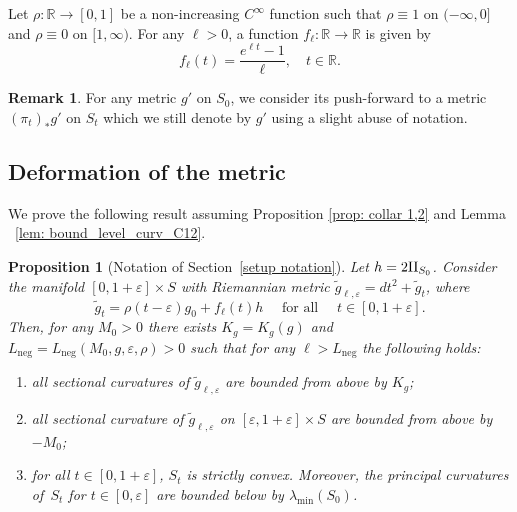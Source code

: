 \documentclass[JEP,XML,SOM,Unicode,NoFloatCountersInSection]{cedram}
\newenvironment{enumeratea}
{\bgroup\def\theenumi{\alph{enumi}}\begin{enumerate}}
{\end{enumerate}\egroup}
\newcommand{\Neg}{\mathrm{neg}}
\newtheorem{proposition}[theorem]{Proposition}
\theoremstyle{definition}
\newtheorem{remark}[theorem]{Remark}
\let\eps\varepsilon
\newcommand{\RomanNumeralCaps}[1]
{\MakeUppercase{\romannumeral #1}}
\newcommand{\II}{\textup{\RomanNumeralCaps{2}}}
\renewcommand{\>}{{\rangle}}
\newcommand{\<}{{\langle}}
\begin{document}
Let $\rho\colon\mathbb R\to [0,1]$ be a non-increasing $C^\infty$ function such that $\rho\equiv 1$ on $(-\infty,0]$ and $\rho\equiv 0$ on $[1,\infty)$. For any $\ell>0$, a function $f_{\ell}\colon\mathbb R\to\mathbb R$ is given by
\[
f_{\ell}(t)=\frac{e^{\ell t}-1}{\ell}
,\quad t\in\mathbb R.
\]

\begin{remark}
For any metric $g'$ on $S_0$, we consider its push-forward to a metric $(\pi_t)_*g'$ on $S_t$ which we still denote by $g'$ using a slight abuse of notation.
\end{remark}

\subsection{Deformation of the metric}
We prove the following result assuming Proposition \ref{prop: collar 1,2} and Lemma ~\ref{lem: bound_level_curv_C12}.
\begin{proposition}[Notation of Section~\ref{setup notation}]\label{collar 1,2}
 Let $h=2\II_{S_0}$. Consider the manifold $[0,1+\eps]\times S$ with Riemannian metric
$\tilde g_{\ell,\eps} = dt^2+\tilde g_t$, where
\begin{equation*}
\tilde g_t=\rho(t-\eps)g_0+f_{\ell}(t)h\quad \text{ for all }\quad t\in[0,1+\eps].
\end{equation*}
Then, for any $M_0>0$ there exists $K_g=K_g(g)$ and $L_{\Neg}=L_{\Neg}(M_0, g, \eps, \rho)>0$ such that for any $\ell>L_{\Neg}$ the following holds:
\begin{enumeratea}
\item\label{upper positive} all sectional curvatures of $\tilde g_{\ell,\eps}$ are bounded from above by $K_g$;
\item\label{upper negative from epsilon} all sectional curvature of $\tilde g_{\ell,\eps}$ on $[\eps,1+\eps]\times S$ are bounded from above by $-M_0$;
\item\label{convex in general} for all $t\in[0,1+\eps]$, $S_t$ is strictly convex. Moreover, the principal curvatures of~$S_t$ for $t\in[0,\eps]$ are bounded below by $\lambda_{\min}(S_0)$.
\end{enumeratea}
\end{proposition}
\end{document}
